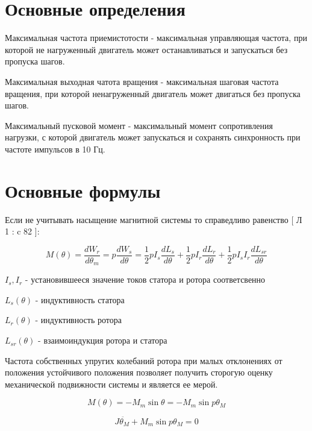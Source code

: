 \part{ Основные определения }
Максимальная частота приемистотости - максимальная управляющая частота, при которой не нагруженный
двигатель может останавливаться и запускаться без пропуска шагов.

Максимальная выходная чатота вращения - максимальная шаговая частота вращения, при которой
ненагруженный двигатель может двигаться без пропуска шагов.

Максимальный пусковой момент - максимальный момент сопротивления нагрузки, с которой двигатель может
запускаться и сохранять синхронность при частоте импульсов в 10 Гц.

\part{ Основные формулы }

Если не учитывать насыщение магнитной системы то справедливо равенство [ Л 1 : c 82 ]:

\begin{equation}
\label{step_motor_torque_common}
    M(\theta)
    = \frac{dW_r}{d\theta_m}
    = p \frac{dW_s}{d\theta}
    = \frac{1}{2} p I_s \frac{dL_s}{d\theta}
        + \frac{1}{2} p I_r \frac{dL_r}{d\theta}
        + \frac{1}{2} p I_{s} I_r \frac{dL_{sr}}{d\theta}
\end{equation}

$I_{s}, I_{r}$ - установившееся значение токов статора и ротора соответсвенно

$L_{s}(\theta)$ - индуктивность статора

$L_{r}(\theta)$ - индуктивность ротора

$L_{sr}(\theta)$ - взаимоиндукция ротора и статора

Частота собственных упругих колебаний ротора \cite[гл 3-1]{Chilikin} при малых отклонениях от положения устойчивого
положения позволяет получить сторогую оценку механической подвижности системы и является ее мерой.

\begin{equation}
\label{step_motor_torque_without_load_and_with_unstable_rotor}
    M(\theta)
    = - M_{m} \sin{\theta}
    = - M_{m} \sin{p\theta_{M}}
\end{equation}

\begin{equation}
\label{step_motor_dynamic_move_equation}
    J \ddot{ \theta_{M} } + M_{m} \sin{p \theta_{M}} = 0
\end{equation}

